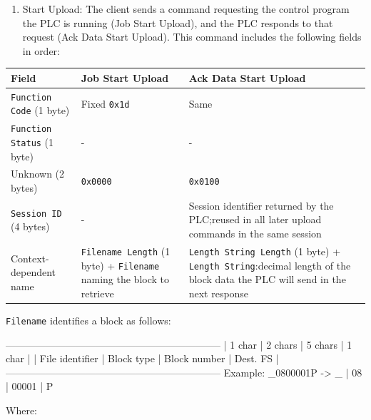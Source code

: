 ﻿\documentclass[../main.tex]{subfiles}
\begin{document}
\begin{enumerate}
    \item Start Upload: The client sends a command requesting the control program the PLC is running (Job Start Upload), and the PLC responds to that request (Ack Data Start Upload). This command includes the following fields in order:
\end{enumerate}


\begin{table}[H]
    \centering
    \footnotesize
    \begin{tabular}{|>{\raggedright\arraybackslash}p{2.6cm}|>{\raggedright\arraybackslash}p{4.1cm}|>{\raggedright\arraybackslash}p{6.3cm}|}
        \hline
        Field & Job Start Upload & Ack Data Start Upload \\
        \hline
        \texttt{Function Code} (1 byte) & Fixed \texttt{0x1d} & Same \\
        \hline
        \texttt{Function Status} (1 byte) & - & - \\
        \hline
        Unknown (2 bytes) & \texttt{0x0000} & \texttt{0x0100} \\
        \hline
        \texttt{Session ID} (4 bytes) &
        - &
        Session identifier returned by the PLC;\linebreak reused in all later upload commands in the same session \\
        \hline
        Context-dependent name &
        \texttt{Filename Length} (1 byte) + \texttt{Filename} naming the block to retrieve &
        \texttt{Length String Length} (1 byte) + \texttt{Length String}:\linebreak decimal length of the block data the PLC will send in the next response \\
        \hline
    \end{tabular}
\end{table}


    \texttt{Filename} identifies a block as follows:


\begin{packetdump}
    -----------------------------------------------------------------
    | 1 char          | 2 chars     | 5 chars        | 1 char    |
    | File identifier | Block type  | Block number   | Dest. FS  |
    -----------------------------------------------------------------
    Example: _0800001P  ->  _ | 08 | 00001 | P
\end{packetdump}


    Where:
\end{document}

